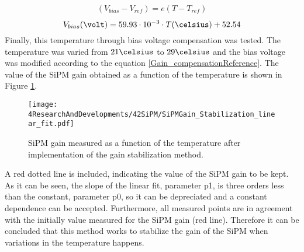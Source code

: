 \begin{equation*}
\begin{split}
(V_{bias}-V_{ref} )= e \left( T -T_{ref} \right) 
\label{Gain_compensationEquation}
\end{split}
\end{equation*}
\begin{equation}
V_{bias}(\volt)= 59.93 \cdot{} 10^{-3} \cdot{} T(\celsius) + 52.54
\label{Gain_compensationReference}
\end{equation}  
Finally, this temperature through bias voltage compensation was tested. The temperature was varied from $21\celsius$ to $29\celsius$ and the bias voltage was modified according to the equation \ref{Gain_compensationReference}. The value of the SiPM gain obtained as a function of the temperature is shown in Figure \ref{fig:SiPMGainStabilization}.

\begin{figure}[hbtp]
\centering
\texttt{[image: 4ResearchAndDevelopments/42SiPM/SiPMGain\_Stabilization\_linear\_fit.pdf]}
\caption{SiPM gain measured as a function of the temperature after implementation of the gain stabilization method. \label{fig:SiPMGainStabilization}}
\end{figure}

A red dotted line is included, indicating the value of the SiPM gain to be kept. As it can be seen, the slope of the linear fit, parameter p1, is three orders less than the constant, parameter p0, so it can be depreciated and a constant dependence can be accepted. Furthermore, all measured points are in agreement with the initially value measured for the SiPM gain (red line). Therefore it can be concluded that this method works to stabilize the gain of the SiPM when variations in the temperature happens.